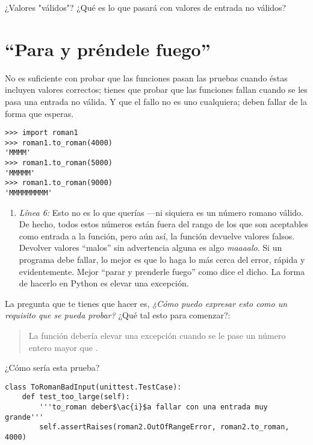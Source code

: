 ¿Valores "válidos"? ¿Qué es lo que pasará con valores de entrada no válidos?


\section{``Para y préndele fuego''}


No es suficiente con probar que las funciones pasan las pruebas cuando éstas incluyen valores correctos; tienes que probar que las funciones fallan cuando se les pasa una entrada no válida. Y que el fallo no es uno cualquiera; deben fallar de la forma que esperas.

\noindent\begin{minipage}{\textwidth}
\begin{lstlisting}[mathescape=True]
>>> import roman1
>>> roman1.to_roman(4000)
'MMMM'
>>> roman1.to_roman(5000)
'MMMMM'
>>> roman1.to_roman(9000)
'MMMMMMMMM'
\end{lstlisting}
\end{minipage}

\begin{enumerate}

\item \emph{Línea 6:} Esto no es lo que querías ---ni siquiera es un número romano válido. De hecho, todos estos números están fuera del rango de los que son aceptables como entrada a la función, pero aún así, la función devuelve valores falsos. Devolver valores ``malos'' sin advertencia alguna es algo \emph{maaaalo}. Si un programa debe fallar, lo mejor es que lo haga lo más cerca del error, rápida y evidentemente. Mejor ``parar y prenderle fuego'' como dice el dicho. La forma de hacerlo en Python es elevar una excepción.

\end{enumerate}

La pregunta que te tienes que hacer es, \emph{¿Cómo puedo expresar esto como un requisito que se pueda probar?} ¿Qué tal esto para comenzar?:

\begin{quote}
La función  debería elevar una excepción  cuando se le pase un número entero mayor que .
\end{quote}

¿Cómo sería esta prueba?

\noindent\begin{minipage}{\textwidth}
\begin{lstlisting}[mathescape=True]
class ToRomanBadInput(unittest.TestCase):
    def test_too_large(self):
        '''to_roman deber$\ac{i}$a fallar con una entrada muy grande'''
        self.assertRaises(roman2.OutOfRangeError, roman2.to_roman, 4000)
\end{lstlisting}
\end{minipage}

